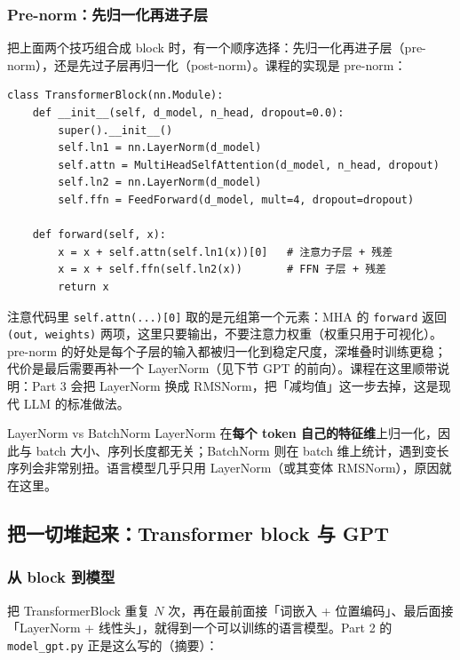 \subsubsection{Pre-norm：先归一化再进子层}

把上面两个技巧组合成 block 时，有一个顺序选择：先归一化再进子层（pre-norm），还是先过子层再归一化（post-norm）。课程的实现是 pre-norm：

\begin{lstlisting}[caption={\texttt{part\_1/block.py}：Transformer block（pre-norm + 残差）}]
class TransformerBlock(nn.Module):
    def __init__(self, d_model, n_head, dropout=0.0):
        super().__init__()
        self.ln1 = nn.LayerNorm(d_model)
        self.attn = MultiHeadSelfAttention(d_model, n_head, dropout)
        self.ln2 = nn.LayerNorm(d_model)
        self.ffn = FeedForward(d_model, mult=4, dropout=dropout)

    def forward(self, x):
        x = x + self.attn(self.ln1(x))[0]   # 注意力子层 + 残差
        x = x + self.ffn(self.ln2(x))       # FFN 子层 + 残差
        return x
\end{lstlisting}

注意代码里 \texttt{self.attn(...)[0]} 取的是元组第一个元素：MHA 的 \texttt{forward} 返回 \texttt{(out, weights)} 两项，这里只要输出，不要注意力权重（权重只用于可视化）。pre-norm 的好处是每个子层的输入都被归一化到稳定尺度，深堆叠时训练更稳；代价是最后需要再补一个 LayerNorm（见下节 GPT 的前向）。课程在这里顺带说明：Part 3 会把 LayerNorm 换成 RMSNorm，把「减均值」这一步去掉，这是现代 LLM 的标准做法。

\begin{warningbox}{LayerNorm vs BatchNorm}
LayerNorm 在\textbf{每个 token 自己的特征维}上归一化，因此与 batch 大小、序列长度都无关；BatchNorm 则在 batch 维上统计，遇到变长序列会非常别扭。语言模型几乎只用 LayerNorm（或其变体 RMSNorm），原因就在这里。
\end{warningbox}

\subsection{把一切堆起来：Transformer block 与 GPT}

\subsubsection{从 block 到模型}

把 TransformerBlock 重复 $N$ 次，再在最前面接「词嵌入 + 位置编码」、最后面接「LayerNorm + 线性头」，就得到一个可以训练的语言模型。Part 2 的 \texttt{model\_gpt.py} 正是这么写的（摘要）：

